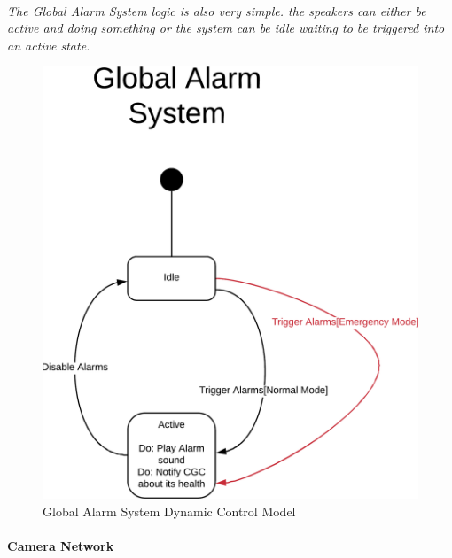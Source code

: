 \documentclass[12pt]{article}
\begin{document}
    \paragraph{}\textit{The Global Alarm System logic is also very simple. the speakers can either be active and doing something or the system can be idle waiting to be triggered into an active state.}
    \begin{figure}[H]
         \centerline{\includegraphics[scale=0.80]{GlobalAlarmSystem.png}}
         \caption{Global Alarm System Dynamic Control Model}
          \label{fig:globalalarmsystem}
    \end{figure}

    \paragraph{Camera Network}
\end{document}
